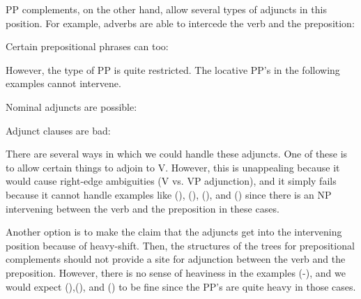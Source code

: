 PP complements, on the other hand, allow several types of adjuncts in
this position.  For example, adverbs are able to intercede the verb
and the preposition:


\noindent Certain prepositional phrases can too:


\noindent However, the type of PP is quite restricted.  The locative
PP's in the following examples cannot intervene.


\noindent 
Nominal adjuncts are possible:


\noindent
Adjunct clauses are bad:


There are several ways in which we could handle these adjuncts.  One
of these is to allow certain things to adjoin to V.  However, this is
unappealing because it would cause right-edge ambiguities (V vs. VP
adjunction), and it simply fails because it cannot handle examples
like (), (), (), and () since there is
an NP intervening between the verb and the preposition in these cases.

Another option is to make the claim that the adjuncts get into the
intervening position because of heavy-shift.  Then, the structures of
the trees for prepositional complements should not provide a site for
adjunction between the verb and the preposition.  However, there is no
sense of heaviness in the examples (-), and we would
expect (),(), and () to be fine since the PP's are
quite heavy in those cases.

